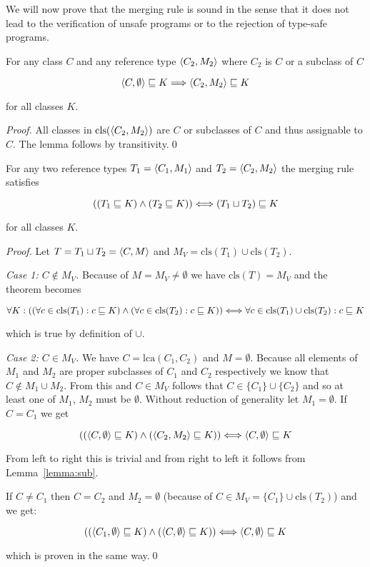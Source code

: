 We will now prove that the merging rule is sound in the sense that it
does not lead to the verification of unsafe programs or to the
rejection of type-safe programs.

\begin{lemma}
\label{lemma:sub}
For any class $C$ and any reference type $\langle C_2, M_2\rangle$ where $C_2$
is $C$ or a subclass of $C$

\[\langle C, \emptyset\rangle\sqsubseteq K \Longrightarrow \langle C_2, M_2\rangle\sqsubseteq K\]

for all classes $K$.
\end{lemma}
\begin{proof}
All classes in $\textrm{cls}(\langle C_2, M_2\rangle)$ are $C$ or subclasses
of $C$ and thus assignable to $C$. The lemma follows by transitivity.\hfill\qed
\end{proof}

\begin{theorem}
For any two reference types $T_1=\langle C_1, M_1\rangle$ and $T_2=\langle C_2, M_2\rangle$ the merging rule satisfies

\[((T_1\sqsubseteq K) \wedge (T_2\sqsubseteq K))
\Longleftrightarrow (T_1 \sqcup T_2) \sqsubseteq K\]

for all classes $K$.
\end{theorem}

\begin{proof}
Let $T = T_1 \sqcup T_2 = \langle C, M\rangle$ and 
$M_V = \textrm{cls}(T_1) \cup \textrm{cls}(T_2)$.

\noindent\textit{Case 1: $C \notin M_V$.} Because of $M = M_V \neq
\emptyset$ we have $\textrm{cls}(T) = M_V$ and the
theorem becomes

\[\forall K:
((\forall c \in \textrm{cls}(T_1): c\sqsubseteq K)
\wedge
(\forall c \in \textrm{cls}(T_2): c\sqsubseteq K))
\Longleftrightarrow
\forall c \in \textrm{cls}(T_1) \cup \textrm{cls}(T_2): c\sqsubseteq K\]

which is true by definition of $\cup$.

\noindent\textit{Case 2: $C \in M_V$.} We have $C =
\textrm{lca}(C_1,C_2)$ and $M = \emptyset$. Because all elements of
$M_1$ and $M_2$ are proper subclasses of $C_1$ and $C_2$ respectively
we know that $C \notin M_1 \cup M_2$. From this and $C \in M_V$
follows that $C \in \{C_1\}\cup\{C_2\}$ and so at least one of $M_1$,
$M_2$ must be $\emptyset$. Without reduction of generality let $M_1 =
\emptyset$. If $C = C_1$ we get

\[
((\langle C, \emptyset\rangle\sqsubseteq K) \wedge (\langle C_2, M_2\rangle\sqsubseteq K))
\Longleftrightarrow
\langle C, \emptyset\rangle\sqsubseteq K
\]

\noindent From left to right this is trivial and from right to left it
follows from Lemma~\ref{lemma:sub}.

\noindent If $C \neq C_1$ then $C = C_2$ and $M_2 = \emptyset$
(because of $C \in M_V = \{C_1\}\cup\textrm{cls}(T_2)$) and we get:

\[
((\langle C_1, \emptyset\rangle\sqsubseteq K) \wedge (\langle C, \emptyset\rangle\sqsubseteq K))
\Longleftrightarrow
\langle C, \emptyset\rangle\sqsubseteq K
\]

\noindent which is proven in the same way.\hfill\qed

\end{proof}


